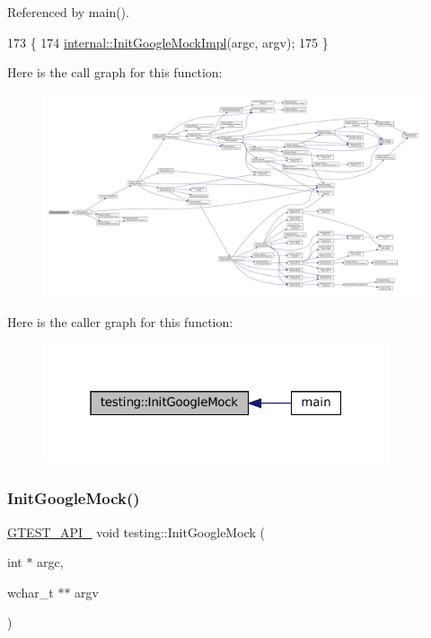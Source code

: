 Referenced by main().


\begin{DoxyCode}
173                                                        \{
174   \hyperlink{namespacetesting_1_1internal_a3823844199df88af9493026031cf7744}{internal::InitGoogleMockImpl}(argc, argv);
175 \}
\end{DoxyCode}
Here is the call graph for this function\+:
\nopagebreak
\begin{figure}[H]
\begin{center}
\leavevmode
\includegraphics[width=350pt]{namespacetesting_a32b1c6db9ba5133ccabfa67616b3c041_cgraph}
\end{center}
\end{figure}
Here is the caller graph for this function\+:
\nopagebreak
\begin{figure}[H]
\begin{center}
\leavevmode
\includegraphics[width=289pt]{namespacetesting_a32b1c6db9ba5133ccabfa67616b3c041_icgraph}
\end{center}
\end{figure}
\mbox{\label{namespacetesting_a20fb86152763dddef67bc1dd8b090800}} 
\subsubsection{\texorpdfstring{Init\+Google\+Mock()}{InitGoogleMock()}\hspace{0.1cm}{\footnotesize\ttfamily [2/2]}}
{\footnotesize\ttfamily \hyperlink{gtest-port_8h_aa73be6f0ba4a7456180a94904ce17790}{G\+T\+E\+S\+T\+\_\+\+A\+P\+I\+\_\+} void testing\+::\+Init\+Google\+Mock (\begin{DoxyParamCaption}\item[{int $\ast$}]{argc,  }\item[{wchar\+\_\+t $\ast$$\ast$}]{argv }\end{DoxyParamCaption})}



